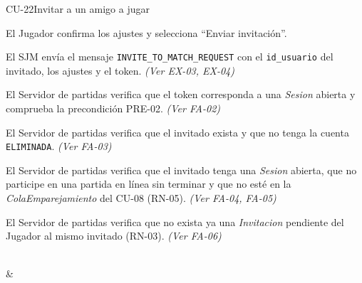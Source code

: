 \begin{fichacu}{CU-22}{Invitar a un amigo a jugar}
{\begin{cuenum}[start=1]
      \item El Jugador confirma los ajustes y selecciona ``Enviar invitación''.
      \item El SJM envía el mensaje \texttt{INVITE\_\allowbreak{}TO\_\allowbreak{}MATCH\_\allowbreak{}REQUEST} con el \texttt{id\_\allowbreak{}usuario} del invitado, los ajustes y el token. \textit{(Ver \mbox{EX-03}, \mbox{EX-04})}
      \item El Servidor de partidas verifica que el token corresponda a una \textit{Sesion} abierta y comprueba la precondición \mbox{PRE-02}. \textit{(Ver \mbox{FA-02})}
      \item El Servidor de partidas verifica que el invitado exista y que no tenga la cuenta \texttt{ELIMINADA}. \textit{(Ver \mbox{FA-03})}
      \item El Servidor de partidas verifica que el invitado tenga una \textit{Sesion} abierta, que no participe en una partida en línea sin terminar y que no esté en la \textit{ColaEmparejamiento} del \mbox{CU-08} (\mbox{RN-05}). \textit{(Ver \mbox{FA-04}, \mbox{FA-05})}
      \item El Servidor de partidas verifica que no exista ya una \textit{Invitacion} pendiente del Jugador al mismo invitado (\mbox{RN-03}). \textit{(Ver \mbox{FA-06})}
    \end{cuenum}} \\
   & 
\end{fichacu}
